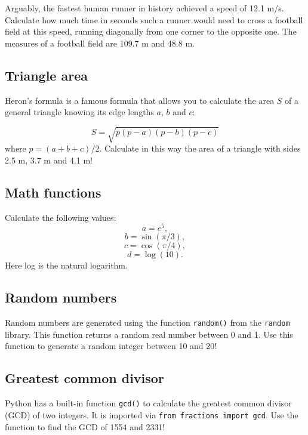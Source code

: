 Arguably, the fastest human runner in history achieved a speed of 12.1 m/s. 
Calculate how much time in seconds such a runner would need to cross a football 
field at this speed, running diagonally from one corner to the opposite one. 
The measures of a football field are 109.7 m and 48.8 m. 


\subsection{Triangle area}

Heron's formula is a famous formula that allows you to calculate the area $S$ of a 
general triangle knowing its edge lengths $a$, $b$ and $c$:

$$
S = \sqrt{p(p-a)(p-b)(p-c)}
$$
where $p = (a + b + c)/2$. Calculate in this way the area of a triangle with sides 
2.5 m, 3.7 m and 4.1 m!


\subsection{Math functions}

Calculate the following values:
$$
a = e^5,
$$
$$
b = \sin(\pi/3),
$$
$$
c = \cos(\pi/4),
$$
$$
d = \log(10).
$$
Here log is the natural logarithm.


\subsection{Random numbers}

Random numbers are generated using the function {\tt random()} from the {\tt random}
library. This function returns a random real number between 0 and 1. 
Use this function to generate a random integer between 
10 and 20!


\subsection{Greatest common divisor}

Python has a built-in function {\tt gcd()} to calculate the greatest common divisor (GCD)
of two integers. It is imported via {\tt from fractions import gcd}. Use 
the function to find the GCD of 1554 and 2331!

